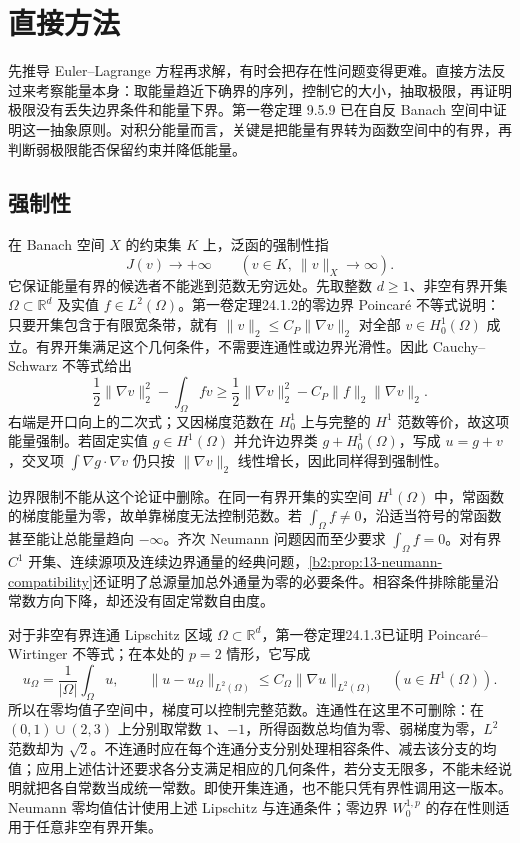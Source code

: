 \section{直接方法}
\label{b2:sec:1404}

先推导 Euler--Lagrange 方程再求解，有时会把存在性问题变得更难。直接方法反过来考察能量本身：取能量趋近下确界的序列，控制它的大小，抽取极限，再证明极限没有丢失边界条件和能量下界。第一卷定理 9.5.9 已在自反 Banach 空间中证明这一抽象原则。对积分能量而言，关键是把能量有界转为函数空间中的有界，再判断弱极限能否保留约束并降低能量。

\subsection{强制性}
\label{b2:subsec:140401}

在 Banach 空间 \(X\) 的约束集 \(K\) 上，泛函的强制性指
\[J(v)\longrightarrow+\infty\qquad(v\in K,\ \lVert v\rVert_X\to\infty).\]
它保证能量有界的候选者不能逃到范数无穷远处。先取整数 \(d\geq1\)、非空有界开集 \(\Omega\subset\mathbb R^d\) 及实值 \(f\in L^2(\Omega)\)。第一卷定理24.1.2的零边界 Poincaré 不等式说明：只要开集包含于有限宽条带，就有 \(\|v\|_2\leq C_P\|\nabla v\|_2\) 对全部 \(v\in H_0^1(\Omega)\) 成立。有界开集满足这个几何条件，不需要连通性或边界光滑性。因此 Cauchy--Schwarz 不等式给出
\[
 \frac12\lVert\nabla v\rVert_2^2-\int_\Omega fv
 \ge\frac12\lVert\nabla v\rVert_2^2-C_P\lVert f\rVert_2\lVert\nabla v\rVert_2.
\]
右端是开口向上的二次式；又因梯度范数在 \(H_0^1\) 上与完整的 \(H^1\) 范数等价，故这项能量强制。若固定实值 \(g\in H^1(\Omega)\) 并允许边界类 \(g+H_0^1(\Omega)\)，写成 \(u=g+v\)，交叉项 \(\int\nabla g\cdot\nabla v\) 仍只按 \(\lVert\nabla v\rVert_2\) 线性增长，因此同样得到强制性。

\ProseParagraphBreak

边界限制不能从这个论证中删除。在同一有界开集的实空间 \(H^1(\Omega)\) 中，常函数的梯度能量为零，故单靠梯度无法控制范数。若 \(\int_\Omega f\ne0\)，沿适当符号的常函数甚至能让总能量趋向 \(-\infty\)。齐次 Neumann 问题因而至少要求 \(\int_\Omega f=0\)。对有界 \(C^1\) 开集、连续源项及连续边界通量的经典问题，\cref{b2:prop:13-neumann-compatibility}还证明了总源量加总外通量为零的必要条件。相容条件排除能量沿常数方向下降，却还没有固定常数自由度。

\ProseParagraphBreak

对于非空有界连通 Lipschitz 区域 \(\Omega\subset\mathbb R^d\)，第一卷定理24.1.3已证明 Poincaré--Wirtinger 不等式；在本处的 \(p=2\) 情形，它写成
\[
 u_\Omega=\frac1{|\Omega|}\int_\Omega u,\qquad
 \|u-u_\Omega\|_{L^2(\Omega)}
 \leq C_\Omega\|\nabla u\|_{L^2(\Omega)}
 \quad(u\in H^1(\Omega)).
\]
所以在零均值子空间中，梯度可以控制完整范数。连通性在这里不可删除：在 \((0,1)\cup(2,3)\) 上分别取常数 \(1\)、\(-1\)，所得函数总均值为零、弱梯度为零，\(L^2\) 范数却为 \(\sqrt2\)。不连通时应在每个连通分支分别处理相容条件、减去该分支的均值；应用上述估计还要求各分支满足相应的几何条件，若分支无限多，不能未经说明就把各自常数当成统一常数。即使开集连通，也不能只凭有界性调用这一版本。Neumann 零均值估计使用上述 Lipschitz 与连通条件；零边界 \(W_0^{1,p}\) 的存在性则适用于任意非空有界开集。

